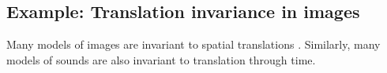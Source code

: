 

%




\subsection{Example: Translation invariance in images}

Many models of images are invariant to spatial translations \citep{lecun1995convolutional}.
Similarly, many models of sounds are also invariant to translation through time.

